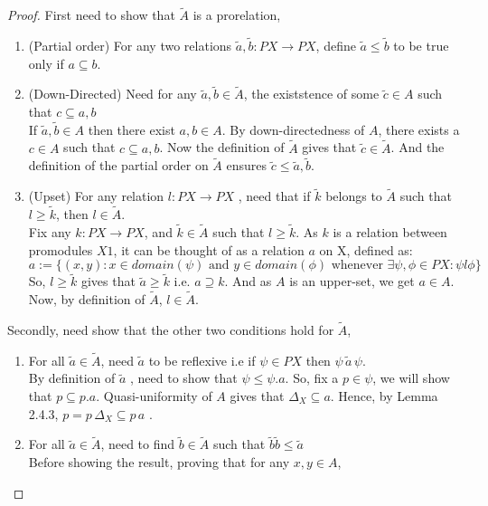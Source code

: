 \documentclass[18pt,a4paper]{article}
\makeatletter
\theoremstyle{definition}
\newcommand{\carrow}{}%
\DeclareRobustCommand{\carrow}{%
	\mathrel{\vphantom{\rightarrow}\mathpalette\circle@arrow\relax}%
}
\newcommand{\circle@arrow}[2]{%
	\m@th
	\ooalign{%
		\hidewidth$#1\circ\mkern1mu$\hidewidth\cr
	$#1\longrightarrow$\cr}%
}
\makeatother
\begin{document}
\begin{proof}
	First need to show that $\tilde{A}$ is a prorelation,
	\begin{enumerate}[label=(\roman*)]
		\item (Partial order) For any two relations $\tilde{a},\tilde{b}:PX \to PX $,
			define $ \tilde{a} \leq \tilde{b}$ to be true only if $a \subseteq b$.
		\item(Down-Directed) Need for any $\tilde{a} ,\tilde{b} \in \tilde{A}$,
			the existstence of some $\tilde{c} \in A$ such that $c \subseteq a,b$\\
			If $\tilde{a} ,\tilde{b} \in A$ then there exist $a,b \in A$. By down-directedness
			of $A$, there exists a $c \in A$ such that  $c \subseteq a,b$. Now the definition
			of $\tilde{A}$ gives that $\tilde{c} \in \tilde{A}$. And the definition of the
			partial order on $\tilde{A}$ ensures $\tilde{c} \leq \tilde{a} ,\tilde{b}$.
		\item (Upset) For any relation $l:PX \to PX$ , need that if  $\tilde{k}$ belongs to
			$\tilde{A}$ such that $l \geq \tilde{k}$, then $l \in \tilde{A}$.\\
			Fix any $k:PX \to PX$, and $\tilde{k} \in \tilde{A}$ such that $l\geq \tilde{k} $.
			As $k$ is a relation between promodules $X \carrow 1$, it can be thought
			of as a relation $a$ on X, defined as:
			\[a:=\{(x,y): x \in domain(\psi) \text{ and }y \in domain(\phi)
			\text{ whenever } \exists \psi,\phi \in PX: \psi l \phi\}\]
			So, $l\geq \tilde{k}$ gives that $\tilde{a}\geq \tilde{k}$ i.e. $a \supseteq k.$
			And as $A$ is an upper-set, we get $a\in A$. Now, by definition of $\tilde{A}$,
			$l \in \tilde{A}$.
	\end{enumerate}
	Secondly, need show that the other two conditions hold for $\tilde{A}$,
	\begin{enumerate}[label=(\roman*)]
		\item For all $\tilde{a} \in \tilde{A}$, need $\tilde{a}$ to be reflexive i.e
			if $\psi \in PX$ then $\psi \, \tilde{a} \, \psi$.\\
			By definition of $\tilde{a}$ , need to show that $\psi \leq \psi.a$.
			So, fix a $p \in \psi$, we will show that $p \subseteq p.a$.
			Quasi-uniformity of $A$ gives that $\Delta_X \subseteq a$. Hence, by Lemma 2.4.3,
			$p=p \, \Delta_X \subseteq p \,a$ .
		\item For all $\tilde{a} \in \tilde{A}$, need to find $\tilde{b}\in \tilde{A}$ such that
			$\tilde{b}\tilde{b} \leq \tilde{a} $\\
			Before showing the result, proving that for any $x,y \in A$,

\end{enumerate}
\end{proof}
\end{document}
